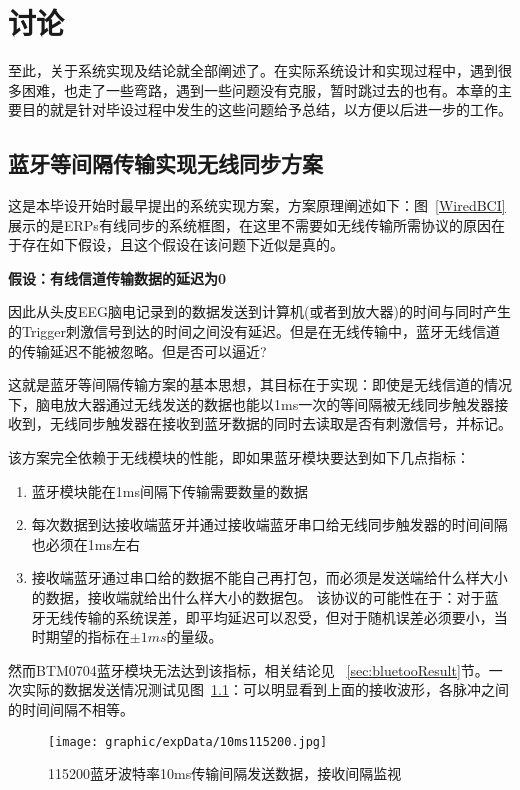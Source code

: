 \chapter{讨\quad 论}

至此，关于系统实现及结论就全部阐述了。在实际系统设计和实现过程中，遇到很多困难，也走了一些弯路，遇到一些问题没有克服，暂时跳过去的也有。本章的主要目的就是针对毕设过程中发生的这些问题给予总结，以方便以后进一步的工作。

\section{蓝牙等间隔传输实现无线同步方案}

	这是本毕设开始时最早提出的系统实现方案，方案原理阐述如下：图~\ref{WiredBCI}展示的是ERPs有线同步的系统框图，在这里不需要如无线传输所需协议的原因在于存在如下假设，且这个假设在该问题下近似是真的。

\begin{center}
\textbf{假设：有线信道传输数据的延迟为0}
\end{center}

因此从头皮EEG脑电记录到的数据发送到计算机(或者到放大器)的时间与同时产生的Trigger刺激信号到达的时间之间没有延迟。但是在无线传输中，蓝牙无线信道的传输延迟不能被忽略。但是否可以逼近?

	这就是蓝牙等间隔传输方案的基本思想，其目标在于实现：即使是无线信道的情况下，脑电放大器通过无线发送的数据也能以1ms一次的等间隔被无线同步触发器接收到，无线同步触发器在接收到蓝牙数据的同时去读取是否有刺激信号，并标记。

	该方案完全依赖于无线模块的性能，即如果蓝牙模块要达到如下几点指标：
\begin{enumerate}
\item	蓝牙模块能在1ms间隔下传输需要数量的数据
\item	每次数据到达接收端蓝牙并通过接收端蓝牙串口给无线同步触发器的时间间隔也必须在1ms左右
\item	接收端蓝牙通过串口给的数据不能自己再打包，而必须是发送端给什么样大小的数据，接收端就给出什么样大小的数据包。
该协议的可能性在于：对于蓝牙无线传输的系统误差，即平均延迟可以忍受，但对于随机误差必须要小，当时期望的指标在$\pm 1ms$的量级。
\end{enumerate}

	然而BTM0704蓝牙模块无法达到该指标，相关结论见 ~\ref{sec:bluetooResult}节。一次实际的数据发送情况测试见图~\ref{10ms115200SendRec}：可以明显看到上面的接收波形，各脉冲之间的时间间隔不相等。

\begin{figure}[!hbp]
\begin{center}
\texttt{[image: graphic/expData/10ms115200.jpg]}
\caption{115200蓝牙波特率10ms传输间隔发送数据，接收间隔监视 \label{10ms115200SendRec}}
\end{center}
\end{figure}


